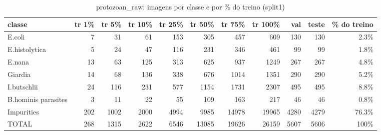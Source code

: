 \begin{table}[h]\centering\small
\caption{protozoan_raw: imagens por classe e por \% do treino (split1)}
\begin{tabular}{lrrrrrrrrrr}\toprule
classe & tr 1\% & tr 5\% & tr 10\% & tr 25\% & tr 50\% & tr 75\% & tr 100\% & val & teste & \% do treino \\\midrule
E.coli & 7 & 31 & 61 & 153 & 305 & 457 & 609 & 130 & 130 & 2.3\% \\
E.histolytica & 5 & 24 & 47 & 116 & 231 & 346 & 461 & 99 & 99 & 1.8\% \\
E.nana & 13 & 63 & 125 & 313 & 625 & 937 & 1249 & 267 & 267 & 4.8\% \\
Giardia & 14 & 68 & 136 & 338 & 676 & 1014 & 1351 & 290 & 290 & 5.2\% \\
I.butschlii & 24 & 116 & 231 & 577 & 1154 & 1731 & 2307 & 495 & 495 & 8.8\% \\
B.hominis parasites & 3 & 11 & 22 & 55 & 109 & 163 & 217 & 46 & 46 & 0.8\% \\
Impurities & 202 & 1002 & 2000 & 4994 & 9985 & 14978 & 19965 & 4280 & 4279 & 76.3\% \\
\midrule TOTAL & 268 & 1315 & 2622 & 6546 & 13085 & 19626 & 26159 & 5607 & 5606 & 100\% \\\bottomrule
\end{tabular}\end{table}
